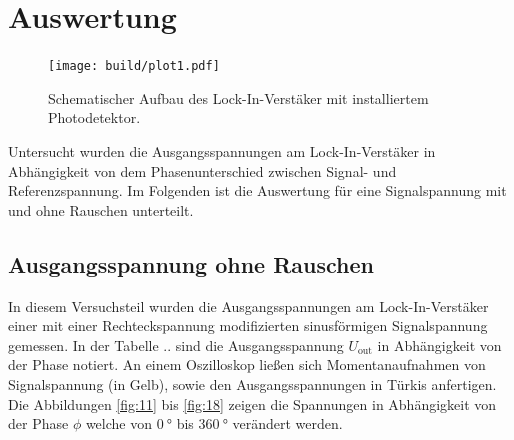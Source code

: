 \section{Auswertung}
\begin{figure}
    \centering
    \texttt{[image: build/plot1.pdf]}
    \caption{Schematischer Aufbau des Lock-In-Verstäker mit installiertem Photodetektor. \cite{skript}} 
    \label{fig:licht}
\end{figure}

Untersucht wurden die Ausgangsspannungen am Lock-In-Verstäker in Abhängigkeit von dem Phasenunterschied zwischen Signal- und Referenzspannung. Im Folgenden ist die Auswertung 
für eine Signalspannung mit und ohne Rauschen unterteilt.

\subsection{Ausgangsspannung ohne Rauschen}
In diesem Versuchsteil wurden die Ausgangsspannungen am Lock-In-Verstäker einer mit einer Rechteckspannung modifizierten sinusförmigen Signalspannung gemessen. In der Tabelle ..
sind die Ausgangsspannung $U_{\text{out}}$ in Abhängigkeit von der Phase notiert. An einem Oszilloskop ließen sich Momentanaufnahmen von Signalspannung (in Gelb), sowie den Ausgangsspannungen in Türkis anfertigen.
Die Abbildungen \ref{fig:11} bis \ref{fig:18} zeigen die Spannungen in Abhängigkeit von der Phase $\phi$ welche von $\SI{0}{\degree}$ bis $\SI{360}{\degree}$ verändert werden.
